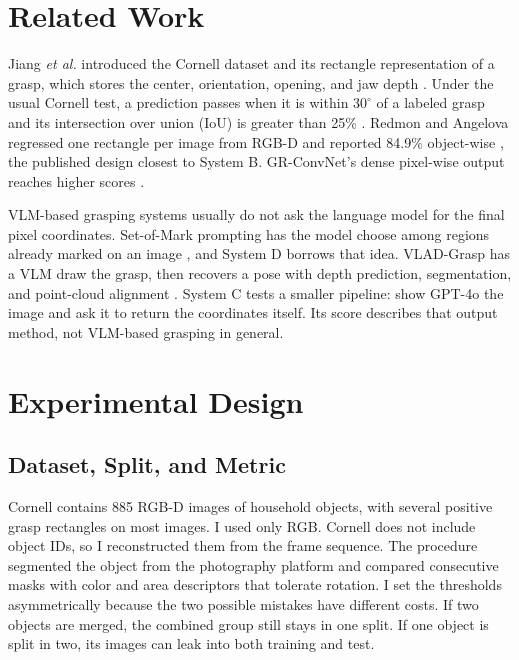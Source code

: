 \documentclass[10pt,conference,compsoc]{IEEEtran}
\begin{document}
\section{Related Work}

Jiang \emph{et al.} introduced the Cornell dataset and its rectangle
representation of a grasp, which stores the center, orientation, opening,
and jaw depth \cite{jiang2011}. Under the usual Cornell test, a prediction
passes when it is within $30^\circ$ of a labeled grasp and its intersection
over union (IoU) is greater than 25\% \cite{lenz2015}. Redmon and Angelova
regressed one rectangle per image from RGB-D and reported 84.9\%
object-wise \cite{redmon2015}, the published design closest to System B.
GR-ConvNet's dense pixel-wise output reaches higher scores \cite{kumra2020}.

VLM-based grasping systems usually do not ask the language model for the
final pixel coordinates. Set-of-Mark prompting has the model choose among
regions already marked on an image \cite{yang2024}, and System D borrows
that idea. VLAD-Grasp has a VLM draw the grasp, then recovers a pose with
depth prediction, segmentation, and point-cloud alignment
\cite{kulshrestha2025}. System C tests a smaller pipeline: show GPT-4o the
image and ask it to return the coordinates itself. Its score describes that
output method, not VLM-based grasping in general.

\section{Experimental Design}

\subsection{Dataset, Split, and Metric}

Cornell contains 885 RGB-D images of household objects, with several positive
grasp rectangles on most images. I used only RGB. Cornell does not include
object IDs, so I reconstructed them from the frame sequence. The procedure
segmented the object from the photography platform and compared consecutive
masks with color and area descriptors that tolerate rotation. I set the
thresholds asymmetrically because the two possible mistakes have different
costs. If two objects are merged, the combined group still stays in one
split. If one object is split in two, its images can leak into both training
and test.
\end{document}
